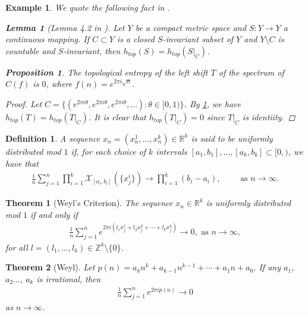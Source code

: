 \documentclass[a4paper,10pt]{amsart}
\newtheorem{example}{Example}[section]
\newtheorem{theorem}{Theorem}[section]
\newtheorem{proposition}{Proposition}[section]
\newtheorem{definition}{Definition}[section]
\newtheorem{lemma}{Lemma}[section]
\newcommand{\X}{\mathcal X}
\newcommand{\R}{\mathbb R}  %
\newcommand{\Z}{\mathbb Z} %
\begin{document}
\begin{example}
We quote the following fact in \cite{JO}.

\begin{lemma}[Lemma 4.2 in \cite{JO}]\label{w_lam6}
Let $Y$ be a compact metric space and $S : Y \to Y$ a
continuous mapping. If $C \subset Y$ 
is a closed $S$-invariant subset of $Y$ and
$Y \setminus C$ is countable and $S$-invariant, 
then $h_{top}(S) = h_{top}(S|_{C})$.
\end{lemma}

\begin{proposition}
The topological entropy of the left shift $T$
of the spectrum of $C(f)$ is $0$, where $f(n) = e^{2\pi i \sqrt{n}}$. 
\end{proposition}

\begin{proof}
Let $C =\{(e^{2\pi i \theta}, e^{2\pi i \theta},
e^{2\pi i \theta}, \ldots ):\theta \in [0, 1) \}$.
By \cref{w_lam6}, we have $h_{top}(T) = h_{top}(T|_C)$.
It is clear that $h_{top}(T|_C) =0$ since $T|_C$ is identiity.
\end{proof}
\end{example}



\begin{definition}
    A sequence $x_n = (x^{1}_{n}, \ldots, x^{k}_{n}) \in \R^{k}$ 
    is said to be uniformly distributed mod $1$ if, for each choice 
    of $k$ intervals $[a_1, b_1], \ldots, [a_k, b_k] \subset [0, )$,
    we have that
    \begin{align*}
        \frac{1}{n}\sum^{n}_{j=1}
        \prod_{i=1}^{k}\X_{[a_i, b_i]}(\{x^{i}_{j}\}) \to 
        \prod_{i=1}^{k}(b_i - a_i), \qquad \mbox{ as }  n \to \infty.
    \end{align*}
\end{definition}

\begin{theorem}[Weyl's Criterion]\label{w_thm2}
   The sequence $x_n \in \R^{k}$ is uniformly distributed mod $1$ if and
   only if
    \begin{align*}
        \frac{1}{n}\sum^{n}_{j=1} e^{2\pi i 
        (l_{1} x_{j}^{1} + l_{2} x_{j}^{2} + \cdots + l_{k} x_{j}^{k})} 
        \to 0, \mbox{ as $n \to \infty$},
    \end{align*}
    for all $l = (l_1, \ldots, l_k) \in \Z^{k} \setminus \{0\}$.
\end{theorem}

\begin{theorem}[Weyl]\label{w_thm3}
    Let $p(n) = a_{k}n^{k} + a_{k-1}n^{k-1} + \cdots + a_{1}n + a_{0}$.
    If any $a_1$, $a_2 \ldots$, $a_{k}$ is irrational, then
    \begin{align*}
        \frac{1}{n} \sum^{n}_{j=1} e^{2\pi i p(n)} \to 0 
    \end{align*}
    as $n \to \infty$.
\end{theorem}
\end{document}
